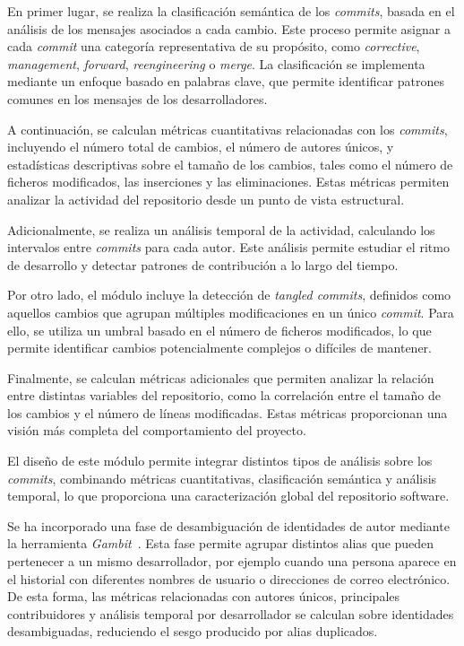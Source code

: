 \documentclass[a4paper, 12pt]{book}
\begin{document}
En primer lugar, se realiza la clasificación semántica de los \emph{commits}, basada en el análisis de los mensajes asociados a cada cambio. Este proceso permite asignar a cada \emph{commit} una categoría representativa de su propósito, como \emph{corrective}, \emph{management}, \emph{forward}, \emph{reengineering} o \emph{merge}. La clasificación se implementa mediante un enfoque basado en palabras clave, que permite identificar patrones comunes en los mensajes de los desarrolladores.

A continuación, se calculan métricas cuantitativas relacionadas con los \emph{commits}, incluyendo el número total de cambios, el número de autores únicos, y estadísticas descriptivas sobre el tamaño de los cambios, tales como el número de ficheros modificados, las inserciones y las eliminaciones. Estas métricas permiten analizar la actividad del repositorio desde un punto de vista estructural.

Adicionalmente, se realiza un análisis temporal de la actividad, calculando los intervalos entre \emph{commits} para cada autor. Este análisis permite estudiar el ritmo de desarrollo y detectar patrones de contribución a lo largo del tiempo.

Por otro lado, el módulo incluye la detección de \emph{tangled commits}, definidos como aquellos cambios que agrupan múltiples modificaciones en un único \emph{commit}. Para ello, se utiliza un umbral basado en el número de ficheros modificados, lo que permite identificar cambios potencialmente complejos o difíciles de mantener.

Finalmente, se calculan métricas adicionales que permiten analizar la relación entre distintas variables del repositorio, como la correlación entre el tamaño de los cambios y el número de líneas modificadas. Estas métricas proporcionan una visión más completa del comportamiento del proyecto.

El diseño de este módulo permite integrar distintos tipos de análisis sobre los \emph{commits}, combinando métricas cuantitativas, clasificación semántica y análisis temporal, lo que proporciona una caracterización global del repositorio software.

Se ha incorporado una fase de desambiguación de identidades de autor mediante la herramienta \emph{Gambit}~\cite{gote2021gambit}. Esta fase permite agrupar distintos alias que pueden pertenecer a un mismo desarrollador, por ejemplo cuando una persona aparece en el historial con diferentes nombres de usuario o direcciones de correo electrónico. De esta forma, las métricas relacionadas con autores únicos, principales contribuidores y análisis temporal por desarrollador se calculan sobre identidades desambiguadas, reduciendo el sesgo producido por alias duplicados.
\end{document}
